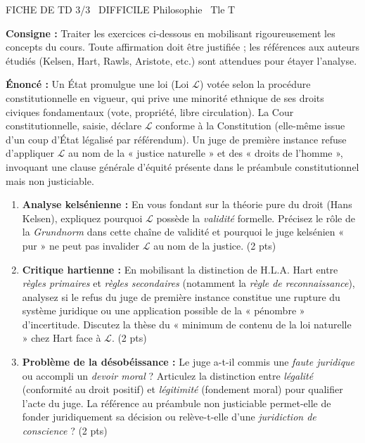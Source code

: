 \documentclass[11pt]{article}
\begin{document}
\begin{tcolorbox}[enhanced,colback=popink,colframe=popink,arc=10pt,boxrule=0pt,left=12pt,right=12pt,top=9pt,bottom=9pt]
{\color{white}\popxbold\small FICHE DE TD 3/3 \textbullet\ DIFFICILE \hfill Philosophie \textbullet\ Tle T\par}
\end{tcolorbox}
\vspace{4pt}
\noindent\textbf{Consigne :} Traiter les exercices ci-dessous en mobilisant rigoureusement les concepts du cours. Toute affirmation doit être justifiée ; les références aux auteurs étudiés (Kelsen, Hart, Rawls, Aristote, etc.) sont attendues pour étayer l'analyse.

\begin{exercice}
\textbf{Énoncé :} Un État promulgue une loi (Loi $\mathcal{L}$) votée selon la procédure constitutionnelle en vigueur, qui prive une minorité ethnique de ses droits civiques fondamentaux (vote, propriété, libre circulation). La Cour constitutionnelle, saisie, déclare $\mathcal{L}$ conforme à la Constitution (elle-même issue d'un coup d'État légalisé par référendum). Un juge de première instance refuse d'appliquer $\mathcal{L}$ au nom de la « justice naturelle » et des « droits de l'homme », invoquant une clause générale d'équité présente dans le préambule constitutionnel mais non justiciable.

\begin{enumerate}
    \item \textbf{Analyse kelsénienne :} En vous fondant sur la théorie pure du droit (Hans Kelsen), expliquez pourquoi $\mathcal{L}$ possède la \textit{validité} formelle. Précisez le rôle de la \textit{Grundnorm} dans cette chaîne de validité et pourquoi le juge kelsénien « pur » ne peut pas invalider $\mathcal{L}$ au nom de la justice. (2 pts)
    \item \textbf{Critique hartienne :} En mobilisant la distinction de H.L.A. Hart entre \textit{règles primaires} et \textit{règles secondaires} (notamment la \textit{règle de reconnaissance}), analysez si le refus du juge de première instance constitue une rupture du système juridique ou une application possible de la « pénombre » d'incertitude. Discutez la thèse du « minimum de contenu de la loi naturelle » chez Hart face à $\mathcal{L}$. (2 pts)
    \item \textbf{Problème de la désobéissance :} Le juge a-t-il commis une \textit{faute juridique} ou accompli un \textit{devoir moral} ? Articulez la distinction entre \textit{légalité} (conformité au droit positif) et \textit{légitimité} (fondement moral) pour qualifier l'acte du juge. La référence au préambule non justiciable permet-elle de fonder juridiquement sa décision ou relève-t-elle d'une \textit{juridiction de conscience} ? (2 pts)
\end{enumerate}
\end{exercice}
\end{document}
